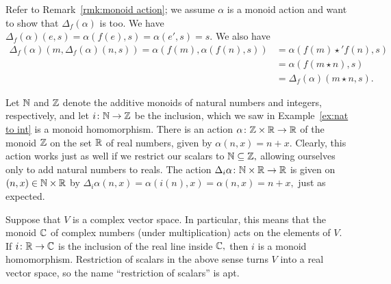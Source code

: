 \documentclass[CT4S-EN-RU]{subfiles}
\begin{document}
\begin{propositionRUS}\label{prop:restriction of scalars}
\end{propositionRUS}

\begin{proofENG}
Refer to Remark~\ref{rmk:monoid action}; we assume $\alpha$ is a monoid action and want to show that $\Delta_f(\alpha)$ is too. We have $\Delta_f(\alpha)(e,s)=\alpha(f(e),s)=\alpha(e',s)=s.$ We also have
\begin{align*}
\Delta_f(\alpha)(m,\Delta_f(\alpha)(n,s))=\alpha(f(m),\alpha(f(n),s))&=\alpha(f(m)\star' f(n),s)\\
&=\alpha(f(m\star n),s)\\
&=\Delta_f(\alpha)(m\star n,s).
\end{align*}
\end{proofENG}

\begin{proofRUS}
\end{proofRUS}

\begin{exampleENG}
Let ${\mathbb N}$ and ${\mathbb Z}$ denote the additive monoids of natural numbers and integers, respectively, and let $i\colon{\mathbb N}\rightarrow{\mathbb Z}$ be the inclusion, which we saw in Example~\ref{ex:nat to int} is a monoid homomorphism. There is an action $\alpha\colon{\mathbb Z}\times{\mathbb R}\rightarrow{\mathbb R}$ of the monoid ${\mathbb Z}$ on the set ${\mathbb R}$ of real numbers, given by $\alpha(n,x)=n+x.$ Clearly, this action works just as well if we restrict our scalars to ${\mathbb N}\subseteq{\mathbb Z},$ allowing ourselves only to add natural numbers to reals. The action $\Delta_i\alpha\colon{\mathbb N}\times{\mathbb R}\rightarrow{\mathbb R}$ is given on $(n,x)\in{\mathbb N}\times{\mathbb R}$ by $\Delta_i\alpha(n,x)=\alpha(i(n),x)=\alpha(n,x)=n+x,$ just as expected.
\end{exampleENG}

\begin{exampleRUS}
\end{exampleRUS}

\begin{exampleENG}
Suppose that $V$ is a complex vector space. In particular, this means that the monoid ${\mathbb C}$ of complex numbers (under multiplication) acts on the elements of $V.$ If $i\colon{\mathbb R}\rightarrow{\mathbb C}$ is the inclusion of the real line inside ${\mathbb C},$ then $i$ is a monoid homomorphism. Restriction of scalars in the above sense turns $V$ into a real vector space, so the name “restriction of scalars” is apt.
\end{exampleENG}

\begin{exampleRUS}
\end{exampleRUS}
\end{document}
